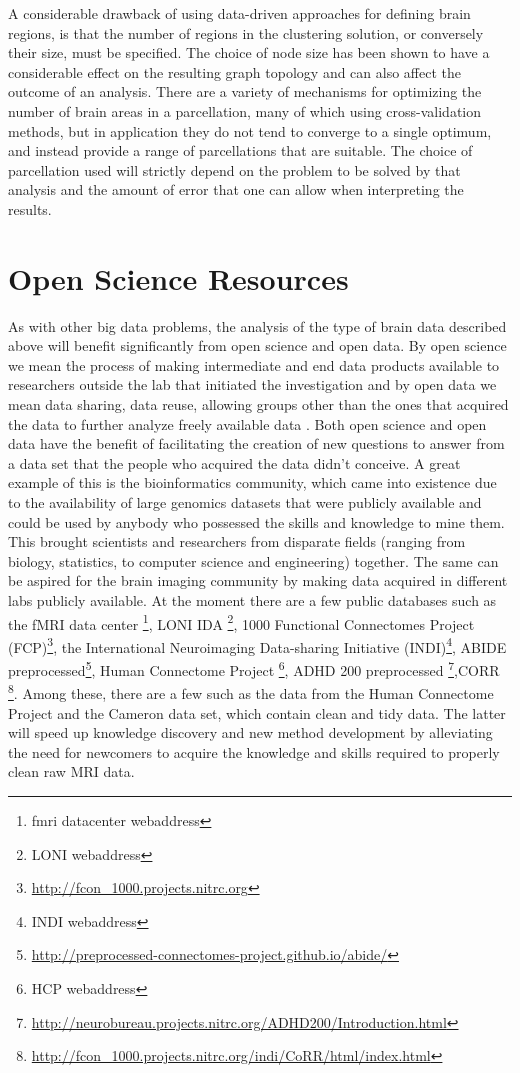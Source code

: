 A considerable drawback of using data-driven approaches for defining brain
regions, is that the number of regions in the clustering solution, or
conversely their size, must be specified. The choice of node size has been
shown to have a considerable effect on the resulting graph topology
\cite{Zalesky} and can also affect the outcome of an analysis\cite{Cecci_2009}.
There are a variety of mechanisms for optimizing the number of brain areas in a
parcellation, many of which using cross-validation methods, but in application
they do not tend to converge to a single optimum, and instead provide a range
of parcellations that are suitable\cite{craddock2012}. The choice of
parcellation used will strictly depend on the problem to be solved by that
analysis and the amount of error that one can allow when interpreting the
results. 


\section{Open Science Resources}

As with other big data problems, the analysis of the type of brain data
described above will benefit significantly from open science and open data. By
open science we mean the process of making intermediate and end data products
available to researchers outside the lab that initiated the investigation and
by open data we mean data sharing, data reuse, allowing groups other than the
ones that acquired the data to further analyze freely available data
\cite{Milham2012}. Both open science and open data have the benefit of
facilitating the creation of new questions to answer from a data set that the
people who acquired the data didn't conceive. A great example of this is the
bioinformatics community, which came into existence due to the availability of
large genomics datasets that were publicly available and could be used by
anybody who possessed the skills and knowledge to mine them\cite{VanHorn2013}.
This brought scientists and researchers from disparate fields (ranging from
biology, statistics, to computer science and engineering) together. The same
can be aspired for the brain imaging community by making data acquired in
different labs publicly available. At the moment there are a few public
databases such as the fMRI data center \footnote{fmri datacenter webaddress},
LONI IDA \footnote{LONI webaddress}, 1000 Functional Connectomes Project
(FCP)\footnote{\url{http://fcon_1000.projects.nitrc.org}}, the International
Neuroimaging Data-sharing Initiative (INDI)\footnote{INDI webaddress}, ABIDE
preprocessed\footnote{\url{http://preprocessed-connectomes-project.github.io/abide/}},
Human Connectome Project \footnote{HCP webaddress}, ADHD 200 preprocessed
\footnote{\url{http://neurobureau.projects.nitrc.org/ADHD200/Introduction.html}},CORR
\footnote{\url{http://fcon_1000.projects.nitrc.org/indi/CoRR/html/index.html}}.
Among these, there are a few such as the data from the Human Connectome Project
and the Cameron data set, which contain clean and tidy data. The latter will
speed up knowledge discovery and new method development by alleviating the need
for newcomers to acquire the knowledge and skills required to properly clean
raw MRI data. 
